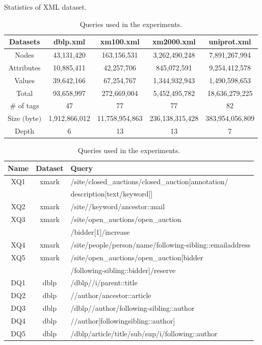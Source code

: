 \begin{table}
	\small
	\caption{Statistics of XML dataset.}
	\label{tab:datasets}
	\begin{tabular}{c|c|c|c|c}
		\hline
		Datasets & dblp.xml & xm100.xml & xm2000.xml & uniprot.xml \\
		\hline \hline
		Nodes & 43,131,420 & 163,156,531 & 3,262,490,248 & 7,891,267,994 \\
		\hline
		Attributes & 10,885,411 & 42,257,706 & 845,072,591 & 9,254,412,578 \\
		\hline
		Values & 39,642,166 & 67,254,767 & 1,344,932,943 & 1,490,598,653 \\
		\hline
		Total & 93,658,997 & 272,669,004 & 5,452,495,782 & 18,636,279,225 \\
		\hline
		\# of tags & 47 & 77 & 77 & 82 \\
		\hline
		Size $($byte$)$ & 1,912,866,012 & 11,758,954,863 & 236,138,315,428 & 383,954,056,809 \\
		\hline
		Depth & 6 & 13 & 13 & 7 \\
		\hline
	\end{tabular}
	\vspace{10px}
	\caption{Queries used in the experiments.}
	\begin{tabular}{c|c|l}
		\hline \hline
		Name & Dataset & Query  \\
		\hline
		XQ1 & xmark & /site/closed\_auctions/closed\_auction[annotation/ \\
		&&description[text/keyword]]\\
		\hline
		XQ2 & xmark & /site//keyword/ancestor::mail \\
		\hline
		XQ3 & xmark & /site/open\_auctions/open\_auction  \\
		&&/bidder[1]/increase\\
		\hline
		XQ4 & xmark & /site/people/person/name/following-sibling::emailaddress \\
		\hline
		XQ5 & xmark & /site/open\_auctions/open\_auction[bidder\\
		&&/following-sibling::bidder]/reserve\\
		\hline
		DQ1 & dblp & /dblp//i/parent::title\\
		\hline
		DQ2 & dblp & //author/ancestor::article \\
		\hline
		DQ3 & dblp & /dblp//author/following-sibling::author \\
		\hline
		DQ4 & dblp & //author[following\textemdash sibling::author] \\
		\hline
		DQ5 & dblp & /dblp/article/title/sub/sup/i/following::author \\

\end{tabular}
\end{table}
